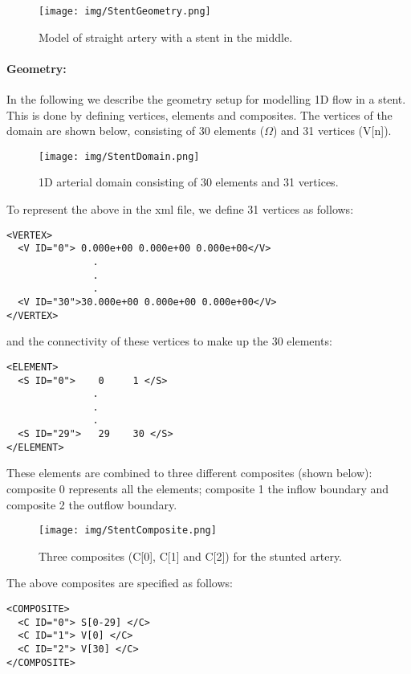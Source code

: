 \begin{figure}
\begin{center}
\texttt{[image: img/StentGeometry.png]}
\caption{Model of straight artery with a stent in the middle.}
\end{center}
\end{figure}

\paragraph{Geometry:~} In the following we describe the geometry setup for modelling 1D flow in a stent. This is done by defining vertices, elements and composites. The vertices of the domain are shown below, consisting of 30 elements ($\Omega$) and 31 vertices (V[n]).

\begin{figure}
\begin{center}
\texttt{[image: img/StentDomain.png]}
\caption{1D arterial domain consisting of 30 elements and 31 vertices.}
\end{center}
\end{figure}

To represent the above in the xml file, we define 31 vertices as follows:
\begin{lstlisting}[style=XMLStyle]
<VERTEX>
  <V ID="0"> 0.000e+00 0.000e+00 0.000e+00</V>
               .
               .
               . 
  <V ID="30">30.000e+00 0.000e+00 0.000e+00</V>
</VERTEX>
\end{lstlisting}
and the connectivity of these vertices to make up the 30 elements:
\begin{lstlisting}[style=XMLStyle]
<ELEMENT>
  <S ID="0">    0     1 </S>
               .
               .
               . 
  <S ID="29">   29    30 </S>
</ELEMENT>
\end{lstlisting}

These elements are combined to three different composites (shown below): composite 0 represents all the elements; composite 1 the inflow boundary and composite 2 the outflow boundary.
 
\begin{figure}
\begin{center}
\texttt{[image: img/StentComposite.png]}
\caption{Three composites (C[0], C[1] and C[2]) for the stunted artery.}
\end{center}
\end{figure}

The above composites are specified as follows:
\begin{lstlisting}[style=XMLStyle]
<COMPOSITE>
  <C ID="0"> S[0-29] </C>
  <C ID="1"> V[0] </C>
  <C ID="2"> V[30] </C>
</COMPOSITE>
\end{lstlisting}

